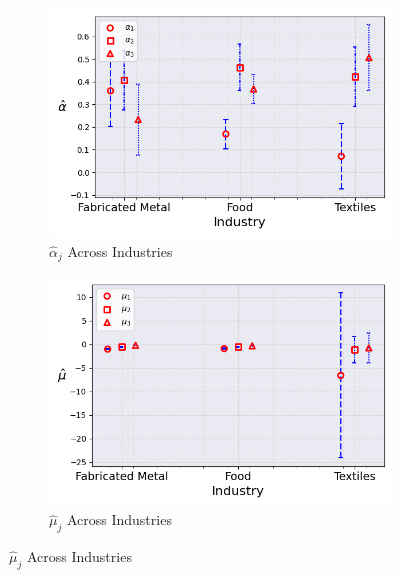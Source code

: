 \documentclass{article}
\begin{document}
\begin{figure}[ht!]
    \centering 
    \caption{I.I.D Normal Model Across Industries ($\hat{M}_0 = 3$)}
    \begin{subfigure}[t]{0.32\textwidth}
        \centering
        \includegraphics[width=\textwidth]{figure/stationary_normal_kmshare_ciiu_alpha_across_industries_m3.png}
        \caption{$\hat\alpha_j$ Across Industries}
    \end{subfigure}
    \begin{subfigure}[t]{0.32\textwidth}
        \centering
        \includegraphics[width=\textwidth]{figure/stationary_normal_kmshare_ciiu_mu_across_industries_m3.png}
        \caption{$\hat\mu_j$ Across Industries}
    \end{subfigure}
 

\end{figure}
\end{document}
